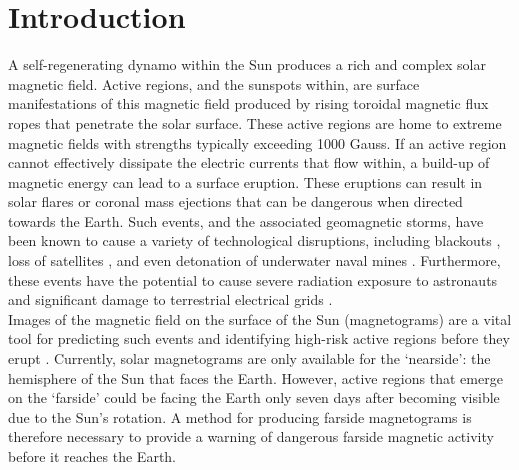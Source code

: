 \documentclass[11pt,a4paper,onecolumn]{report}
\begin{document}





\tableofcontents









%
%
%
%
\chapter{Introduction}
%
%
%
%

A self-regenerating dynamo within the Sun produces a rich and complex solar
magnetic field. Active regions, and the sunspots within, are surface
manifestations of this magnetic field produced by rising toroidal magnetic flux
ropes that penetrate the solar surface. These active regions are home to extreme
magnetic fields with strengths typically exceeding 1000 Gauss. If an active
region cannot effectively dissipate the electric currents that flow within, a
build-up of magnetic energy can lead to a surface eruption. These eruptions can
result in solar flares or coronal mass ejections that can be dangerous when
directed towards the Earth. Such events, and the associated geomagnetic storms,
have been known to cause a variety of technological disruptions, including
blackouts \citep{odenwald_day_2015}, loss of satellites
\citep{carlowicz_did_1997}, and even detonation of underwater naval mines
\citep{knipp_little-known_2018}. Furthermore, these events have the potential to
cause severe radiation exposure to astronauts \citep{hu_modeling_2009} and
significant damage to terrestrial electrical grids \citep{council_severe_2008}.
\\


Images of the magnetic field on the surface of the Sun (magnetograms) are a
vital tool for predicting such events and identifying high-risk active regions
before they erupt
\citep{song_statistical_2009,yuan_solar_2010,lan_automated_2012,bobra_solar_2015,
chen_identifying_2019}. Currently, solar magnetograms are only available for the
`nearside': the hemisphere of the Sun that faces the Earth. However, active
regions that emerge on the `farside' could be facing the Earth only seven days
after becoming visible due to the Sun's rotation. A method for producing farside
magnetograms is therefore necessary to provide a warning of dangerous farside
magnetic activity before it reaches the Earth. \\
\end{document}
